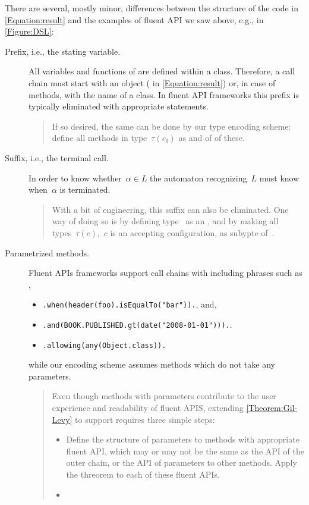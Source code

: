 There are several, mostly minor, differences between the structure of the \Java code
in \cref{Equation:result}
and the examples of fluent API we saw above, e.g., in \cref{Figure:DSL}:
\begin{description}
  \item[Prefix, i.e., the stating  variable.]
  All variables and functions of \Java are defined within a class.
  Therefore, a call chain must start with an object ( in \cref{Equation:result})
  or, in case of  methods, with the name of a class.
  In fluent API frameworks this prefix is typically eliminated
  with appropriate  statements.
  \begin{quote}
  If so desired, the same can be done by our type encoding scheme: define all
  methods in type~$τ(c₀)$ as  and  of of these.
\end{quote}
  \item[Suffix, i.e., the terminal  call.]
  In order to know whether~$α∈L$ the automaton recognizing~$L$ must
  know when~$α$ is terminated.
  \begin{quote}
  With a bit of engineering, this suffix can also be eliminated.
  One way of doing so is by defining type~ as an , and by making all types~$τ(c)$,~$c$ is
  an accepting configuration, as subypte of~.
  \end{quote}
  \item[Parametrized methods.]
  Fluent APIs frameworks support call chains with including phrases such as
    \lstset{language=Java,style=code}, 
  \begin{itemize}
    \item \lstinline{.when(header(foo).isEqualTo("bar")).}, and, 
    \item \lstinline{.and(BOOK.PUBLISHED.gt(date("2008-01-01"))).}.
    \item \lstinline{.allowing(any(Object.class)).}
  \end{itemize}
  while our encoding scheme assumes methods which do not take any parameters.  
  \begin{quote}
    Even though  methods with parameters contribute to the user
      experience and readability of fluent APIS, extending 
      \cref{Theorem:Gil-Levy} to support requires three simple steps: 
      \begin{itemize}
        \item Define the structure of parameters to methods with appropriate fluent API, which may or
          may not be the same as the API of the outer chain, or the API of parameters to
          other methods. Apply the threorem to each of these fluent APIs.
        \item 
      \end{itemize}
  \end{quote}
\end{description}
